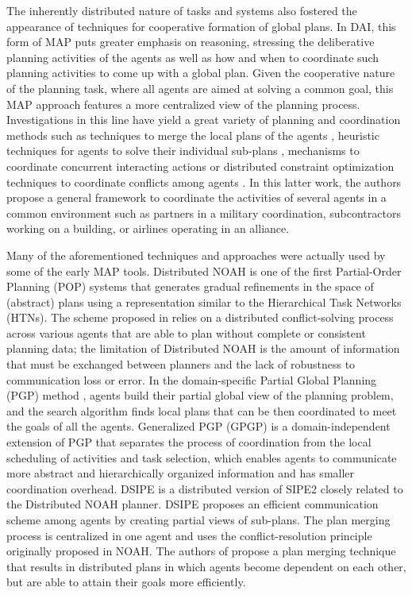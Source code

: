 \documentclass[12pt]{article}
\begin{document}
The inherently distributed nature of tasks and systems also fostered the appearance of techniques for cooperative formation of global plans.
In DAI, this form of MAP puts greater emphasis on reasoning, stressing the deliberative planning activities of the agents as well as how and when to coordinate such planning activities to come up with a global plan.
Given the cooperative nature of the planning task, where all agents are aimed at solving a common goal, this MAP approach features a more centralized view of the planning process.
Investigations in this line have yield a great variety of planning and coordination methods such as techniques to merge the local plans of the agents \cite{Ephrati1994DivideAC}\cite{desJardins1999CoordinatingAD}\cite{1373700}, heuristic techniques for agents to solve their individual sub-plans \cite{Ephrati1997AHT}, mechanisms to coordinate concurrent interacting actions \cite{Boutilier_2001} or distributed constraint optimization techniques to coordinate conflicts among agents \cite{1373700}.
In this latter work, the authors propose a general framework to coordinate the activities of several agents in a common environment such as partners in a military coordination, subcontractors working on a building, or airlines operating in an alliance.

Many of the aforementioned techniques and approaches were actually used by some of the early MAP tools.
Distributed NOAH \cite{10.5555/1624861.1624903} is one of the first Partial-Order Planning (POP) systems that generates gradual refinements in the space of (abstract) plans using a representation similar to the Hierarchical Task Networks (HTNs).
The scheme proposed in \cite{10.5555/1624861.1624903} relies on a distributed conflict-solving process across various agents that are able to plan without complete or consistent planning data; the limitation of Distributed NOAH is the amount of information that must be exchanged between planners and the lack of robustness to communication loss or error.
In the domain-specific Partial Global Planning (PGP) method \cite{120067}, agents build their partial global view of the planning problem, and the search algorithm finds local plans that can be then coordinated to meet the goals of all the agents.
Generalized PGP (GPGP) is a domain-independent extension of PGP \cite{decker_lesser_1992} that separates the process of coordination from the local scheduling of activities and task selection, which enables agents to communicate more abstract and hierarchically organized information and has smaller coordination overhead.
DSIPE \cite{desJardins1999CoordinatingAD} is a distributed version of SIPE2 \cite{10.5555/52077} closely related to the Distributed NOAH planner.
DSIPE proposes an efficient communication scheme among agents by creating partial views of sub-plans.
The plan merging process is centralized in one agent and uses the conflict-resolution principle originally proposed in NOAH.
The authors of \cite{deWeerdt2003} propose a plan merging technique that results in distributed plans in which agents become dependent on each other, but are able to attain their goals more efficiently.
\end{document}
